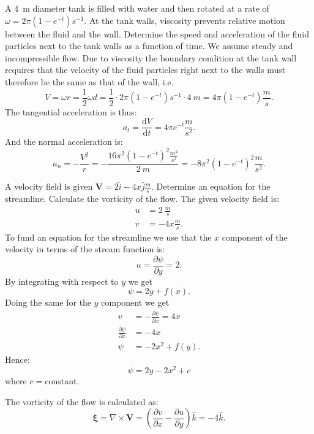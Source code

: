 
A \qty{4}{m} diameter tank is filled with water and then rotated at a rate of $\omega = 2\pi \left( 1 - e^{-t} \right) \unit{s^{-1}}$. At the tank walls, viscosity prevents relative motion between the fluid and the wall. Determine the speed and acceleration of the fluid particles next to the tank walls as a function of time.
\bigbreak
We assume steady and incompressible flow. Due to viscosity the boundary condition at the tank wall requires that the velocity of the fluid particles right next to the walls must therefore be the same as that of the wall, i.e.
\[ 
V = \omega r = \frac{1}{2} \omega d = \frac{1}{2} \cdot 2\pi \left( 1 - e^{-t} \right) \unit{s^{-1}} \cdot \qty{4}{m} = 4\pi \left( 1 - e^{-t} \right) \unit{\frac{m}{s}}
.\]
The tangential acceleration is thus:
\[ 
  a_t = \frac{\mathrm{d}V}{\mathrm{d}t}  = 4 \pi e^{-t} \unit{\frac{m}{s^2}}
.\]
And the normal acceleration is:
\[ 
a_n = - \frac{V^2}{r} = - \frac{16 \pi^2 \left( 1 - e^{-t} \right)^2 \unit{\frac{m^2}{s^2}}}{\qty{2}{m}} = - 8 \pi^2 \left( 1 - e^{-t} \right)^2 \unit{\frac{m}{s^2}}
.\]



A velocity field is given $\textbf{V} = 2 \hat{i} - 4x \hat{j} \unit{\frac{m}{s}}$. Determine an equation for the streamline. Calculate the vorticity of the flow.
\bigbreak
The given velocity field is:
\begin{align*}
  u &= \qty{2}{\frac{m}{s}}  \\
  v &= - 4 x \unit{\frac{m}{s}}
.\end{align*}
To fund an equation for the streamline we use that the $x$ component of the velocity in terms of the stream function is:
\[ 
u = \frac{\partial \psi}{\partial y} = 2
.\]
By integrating with respect to $y$ we get
\[ 
\psi = 2y + f(x)
.\]
Doing the same for the $y$ component we get
\begin{align*}
  v &= -\frac{\partial \psi}{\partial x} = 4x \\
  \frac{\partial \psi}{\partial x} &= -4x \\
  \psi &= - 2x^2 + f(y)
.\end{align*}
Hence:
\[ 
\psi = 2y - 2x^2 + c
\]
where $c = \mathrm{constant}$. 

The vorticity of the flow is calculated as:
\[ 
  \boldsymbol{\xi} = \nabla \times \textbf{V} = \left( \frac{\partial v}{\partial x} - \frac{\partial u}{\partial y}  \right) \hat{k} = -4 \hat{k}
.\]


